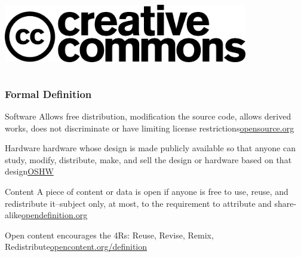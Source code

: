 \documentclass{beamer}
\begin{document}
\begin{frame}
\begin{columns}
\begin{center}
      \vspace{1em}

      \includegraphics[width=0.8\textwidth]{img/cc.png}
    \end{center}
  \end{columns}

\end{frame}

\begin{frame}
  \frametitle{Formal Definition}
  \begin{center}
    \begin{block}{Software}
      Allows free distribution, modification the source code, allows
      derived works, does not discriminate or have limiting license
      restrictions\textemdash\textcolor{beamer@myblue}{\href{http://opensource.org/docs/osd}{opensource.org}}
    \end{block}

    \begin{block}{Hardware}
      hardware whose design is made publicly available so that anyone
      can study, modify, distribute, make, and sell the design or
      hardware based on that design\textemdash\textcolor{beamer@myblue}{\href{http://freedomdefined.org/OSHW}{OSHW}}
    \end{block}

    \begin{block}{Content}
      A piece of content or data is open if anyone is free to use,
      reuse, and redistribute it--subject only, at most, to the
      requirement to attribute and
      share-alike\textemdash\textcolor{beamer@myblue}{\href{http://www.opendefinition.org/}{opendefinition.org}}

      \vspace{1em}
      
      Open content encourages the 4Rs: Reuse, Revise, Remix,
      Redistribute\textemdash\textcolor{beamer@myblue}{\href{http://www.opencontent.org/definition/}{opencontent.org/definition}}
    \end{block}
  \end{center}
\end{frame}
\end{document}
